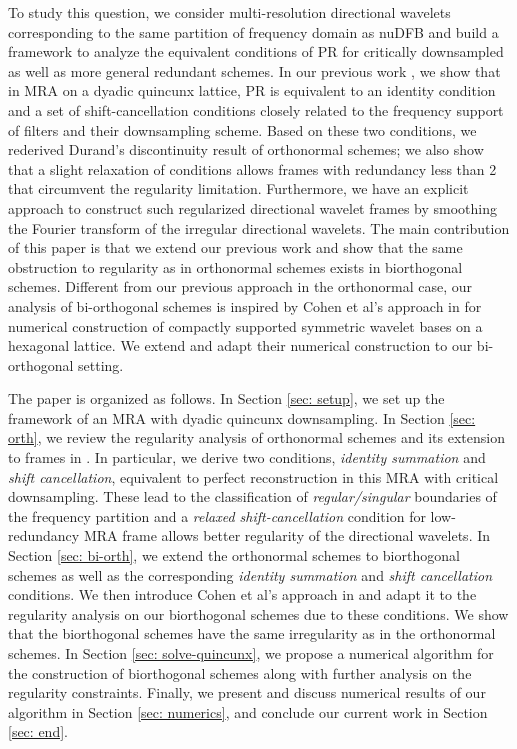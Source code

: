 To study this question, we consider multi-resolution directional wavelets corresponding to the same partition of frequency domain as nuDFB and build a framework to analyze the equivalent conditions of PR for critically downsampled as well as more general redundant schemes. In our previous work \cite{yin2014orthshear}, we show that in MRA on a dyadic quincunx lattice, PR is equivalent to an identity condition and a set of shift-cancellation conditions closely related to the frequency support of filters and their downsampling scheme. Based on these two conditions, we rederived Durand's discontinuity result of orthonormal schemes; we also show that a slight relaxation of conditions allows frames with redundancy less than 2 that circumvent the regularity limitation. Furthermore, we have an explicit approach to construct such regularized directional wavelet frames by smoothing the Fourier transform of the irregular directional wavelets.
The main contribution of this paper is that we extend our previous work and show that the same obstruction to regularity as in orthonormal schemes exists in biorthogonal schemes. Different from our previous approach in the orthonormal case, our analysis of bi-orthogonal schemes is inspired by Cohen et al's approach in \cite{cohen1993compactly} for numerical construction of compactly supported symmetric wavelet bases on a hexagonal lattice. We extend and adapt their numerical construction to our bi-orthogonal setting.

The paper is organized as follows. In Section \ref{sec: setup}, we set up the framework of an MRA with dyadic quincunx downsampling. In Section \ref{sec: orth}, we review the regularity analysis of orthonormal schemes and its extension to frames in \cite{yin2014orthshear}. In particular, we derive two conditions, {\it identity summation} and {\it shift cancellation}, equivalent to perfect reconstruction in this MRA with critical downsampling. These lead to the classification of {\it regular/singular} boundaries of the frequency partition %
and a {\it relaxed shift-cancellation} condition for low-redundancy MRA frame allows better regularity of the directional wavelets. 
In Section \ref{sec: bi-orth}, we extend the orthonormal schemes to biorthogonal schemes as well as the corresponding {\it identity summation} and {\it shift cancellation} conditions. We then introduce Cohen et al's approach in \cite{cohen1993compactly} and adapt it to the regularity analysis on our biorthogonal schemes due to these conditions. We show that the biorthogonal schemes have the same irregularity as in the orthonormal schemes.
In Section \ref{sec: solve-quincunx}, we  propose a numerical algorithm for the construction of biorthogonal schemes along with further analysis on the regularity constraints.
Finally, we present and discuss numerical results of our algorithm in Section \ref{sec: numerics}, and conclude our current work in Section \ref{sec: end}.
